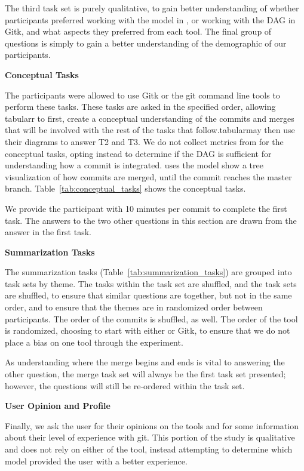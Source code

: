 \documentclass[draft]{IEEEtran}
\begin{document}
The third task set is purely qualitative, to gain better understanding
of whether participants preferred working with the \mt model in \tool,
or working with the DAG in Gitk, and what aspects they preferred from
each tool. The final group of questions is simply to gain a better
understanding of the demographic of our participants.


\textbf{Conceptual Tasks}




The participants were allowed to use Gitk or the git command line tools
to perform these tasks. These tasks are asked in the specified order,
allowing tabularr to first, create a conceptual understanding of the
commits and merges that will be involved with the rest of the tasks that
follow.tabularmay then use their diagrams to answer T2 and T3. We do not
collect metrics from \tool for the conceptual tasks, opting instead to
determine if the DAG is sufficient for understanding how a commit is
integrated. \tool uses the \mt model show a tree visualization of how
commits are merged, until the commit reaches the master branch.
Table~\ref{tab:conceptual_tasks} shows the conceptual tasks.

We provide the participant with 10 minutes per commit to complete the
first task. The answers to the two other questions in this section are
drawn from the answer in the first task.

\textbf{Summarization Tasks}



The summarization tasks (Table~\ref{tab:summarization_tasks}) are
grouped into task sets by theme. The tasks within the task set are
shuffled, and the task sets are shuffled, to ensure that similar
questions are together, but not in the same order, and to ensure that
the themes are in randomized order between participants. The order of
the commits is shuffled, as well. The order of the tool is randomized,
choosing to start with either \tool or Gitk, to ensure that we do not
place a bias on one tool through the experiment.

As understanding where the merge begins and ends is vital to answering
the other question, the merge task set will always be the first task set
presented; however, the questions will still be re-ordered within the
task set.

\textbf{User Opinion and Profile}

Finally, we ask the user for their opinions on the tools and for some
information about their level of experience with git. This portion of
the study is qualitative and does not rely on either of the tool,
instead attempting to determine which model provided the user with a
better experience.
\end{document}

